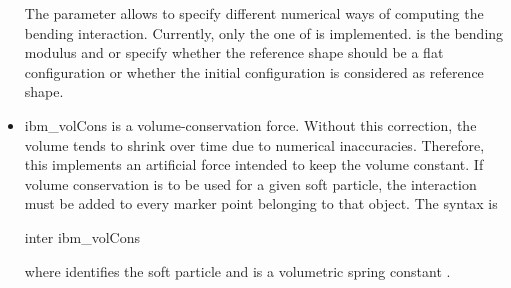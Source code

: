 \begin{itemize}
The parameter  allows to specify different numerical ways
of computing the bending interaction. Currently, only the one of
\cite{KruegerThesis} is implemented.  is the bending modulus and  or  specify whether the reference shape should be a flat configuration or whether the initial configuration is considered as reference shape.

\item ibm_volCons is a volume-conservation force. Without this correction, the volume tends to shrink over time due to numerical inaccuracies. Therefore, this implements an artificial force intended to keep the volume constant. If volume conservation is to be used for a given soft particle, the interaction must be added to every marker point belonging to that object. The syntax is
\begin{essyntax}
  inter  ibm_volCons  
  \begin{features}
  \end{features}
\end{essyntax}
where  identifies the soft particle and  is a volumetric spring constant \cite{KruegerThesis}.
\end{itemize}


